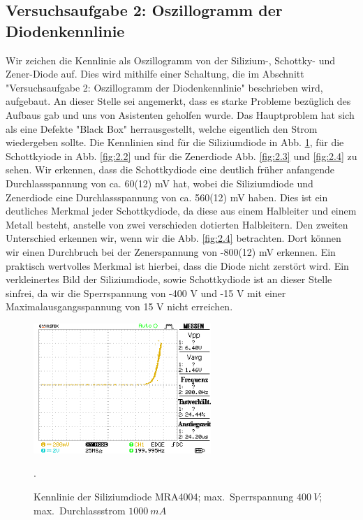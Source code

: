 \documentclass[a4paper,10pt]{article}
\numberwithin{equation}{section}
\begin{document}
\subsection{Versuchsaufgabe 2: Oszillogramm der Diodenkennlinie}
Wir zeichen die Kennlinie als Oszillogramm von der Silizium-, Schottky- und Zener-Diode auf. Dies wird mithilfe einer Schaltung, die im Abschnitt "Versuchsaufgabe 2: Oszillogramm der Diodenkennlinie" \cite{Praktikumsanleitung} beschrieben wird, aufgebaut. An dieser Stelle sei angemerkt, dass es starke Probleme bezüglich des Aufbaus gab und uns von Asistenten geholfen wurde. Das Hauptproblem hat sich als eine Defekte "Black Box" \cite{Praktikumsanleitung} herrausgestellt, welche eigentlich den Strom wiedergeben sollte. Die Kennlinien sind für die Siliziumdiode in Abb. \ref{fig:2.1}, für die Schottkyiode in Abb. \ref{fig:2.2} und für die Zenerdiode Abb. \ref{fig:2.3} und \ref{fig:2.4} zu sehen.
Wir erkennen, dass die Schottkydiode eine deutlich früher anfangende Durchlassspannung von ca. 60(12) mV hat, wobei die Siliziumdiode und Zenerdiode eine Durchlassspannung von ca. 560(12) mV haben. Dies ist ein deutliches Merkmal jeder Schottkydiode, da diese aus einem Halbleiter und einem Metall besteht, anstelle von zwei verschieden dotierten Halbleitern. Den zweiten Unterschied erkennen wir, wenn wir die Abb. \ref{fig:2.4} betrachten. Dort können wir einen Durchbruch bei der Zenerspannung von -800(12) mV erkennen. Ein praktisch wertvolles Merkmal ist hierbei, dass die Diode nicht zerstört wird. Ein verkleinertes Bild der Siliziumdiode, sowie Schottkydiode ist an dieser Stelle sinfrei, da wir die Sperrspannung von -400 V und -15 V mit einer Maximalausgangsspannung von 15 V nicht erreichen.
\begin{figure}[h]
	\centering
	\includegraphics[width=0.6\textwidth]{data/Kennlinie_a1_d1.BMP.png}
	\caption{Kennlinie der Siliziumdiode MRA4004; max.\ Sperrspannung $\SI{400}{V}$; max.\ Durchlassstrom $\SI{1000}{mA}$}.
	\label{fig:2.1}
\end{figure}
\end{document}
